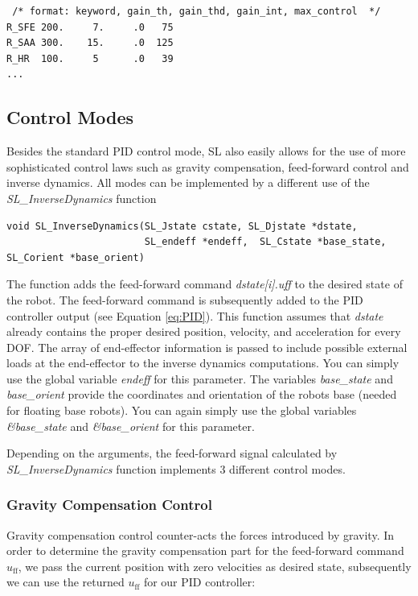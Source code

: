 \documentclass[11pt, article, colorback]{article}
\begin{document}
\begin{lstlisting}
 /* format: keyword, gain_th, gain_thd, gain_int, max_control  */
R_SFE 200.     7.     .0   75
R_SAA 300.    15.     .0  125
R_HR  100.     5      .0   39
...
\end{lstlisting}
\subsection{Control Modes}
Besides the standard PID control mode, SL also easily allows for the use of more sophisticated control laws such as gravity compensation, feed-forward control and inverse dynamics. 
All modes can be implemented by a different use of the {\em SL\_InverseDynamics} function
\begin{lstlisting}
void SL_InverseDynamics(SL_Jstate cstate, SL_Djstate *dstate, 
                        SL_endeff *endeff,  SL_Cstate *base_state, SL_Corient *base_orient)
\end{lstlisting}
The function adds the feed-forward command {\em dstate[i].uff} to the desired state of the robot. The feed-forward command is subsequently added to the PID controller output (see Equation \ref{eq:PID}).
This function assumes that {\em dstate} already contains the proper desired position, velocity,
and acceleration for every DOF. The array of end-effector information is passed to
include possible external loads at the end-effector to the inverse dynamics computations. You can simply use the global variable {\em endeff} for this parameter. The variables {\em base\_state} and {\em base\_orient} provide the coordinates
and orientation of the robots base (needed for floating base robots). You can again simply use the global variables {\em \&base\_state} and {\em \&base\_orient} for this parameter. 

Depending on the arguments, the feed-forward signal calculated by {\em SL\_InverseDynamics} function implements 3 different control modes.

\subsubsection{Gravity Compensation Control}
Gravity compensation control counter-acts the forces introduced by gravity. In order to determine the gravity compensation part for the feed-forward command $u_{\textrm{ff}}$, we pass the current position with zero velocities as desired state, subsequently
we can use the returned $u_{\textrm{ff}}$ for our PID controller:
\end{document}
